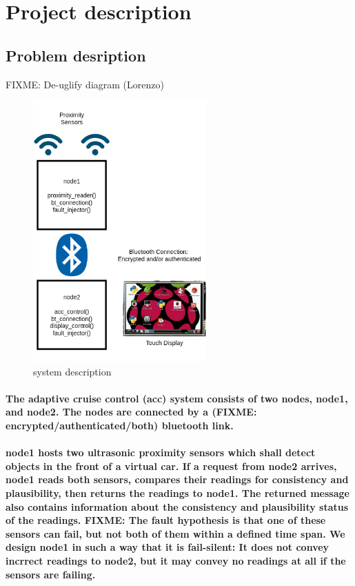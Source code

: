 \section{Project description}
\label{chapter1}

\subsection{Problem desription}

FIXME: De-uglify diagram (Lorenzo)

\begin{figure}[h]
	\includegraphics[height=100mm]{images/system}
	\centering
	\caption{system description}
	\label{fig:system}
\end{figure}

\paragraph
{
The adaptive cruise control (acc) system consists of two nodes, node1, and node2. The nodes are connected
by a (FIXME: encrypted/authenticated/both) bluetooth link.
}

\paragraph
{
	node1 hosts two ultrasonic proximity sensors which shall detect objects in the front of a virtual car. If
	a request from node2 arrives, node1 reads both sensors, compares their readings for consistency and plausibility,
	then returns the readings to node1. The returned message also contains information about the consistency and
	plausibility status of the readings.
	FIXME: The fault hypothesis is that one of these sensors can fail, but not both of them within a defined
	time span. We design node1 in such a way that it is fail-silent: It does not convey incrrect readings to node2,
	but it may convey no readings at all if the sensors are failing.
}


